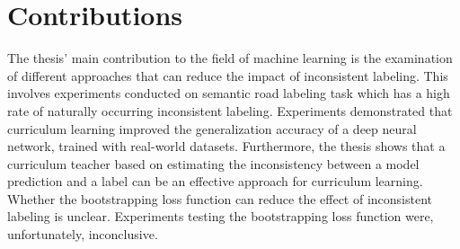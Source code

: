 \section{Contributions}
\label{sec:IntroContributions}
The thesis' main contribution to the field of machine learning is the examination of different approaches that can reduce the impact of inconsistent labeling. This involves experiments conducted on semantic road labeling task which has a high rate of naturally occurring inconsistent labeling. Experiments demonstrated that curriculum learning improved the generalization accuracy of a deep neural network, trained with real-world datasets. Furthermore, the thesis shows that a curriculum teacher based on estimating the inconsistency between a model prediction and a label can be an effective approach for curriculum learning. Whether the bootstrapping loss function can reduce the effect of inconsistent labeling is unclear. Experiments testing the bootstrapping loss function were, unfortunately, inconclusive.